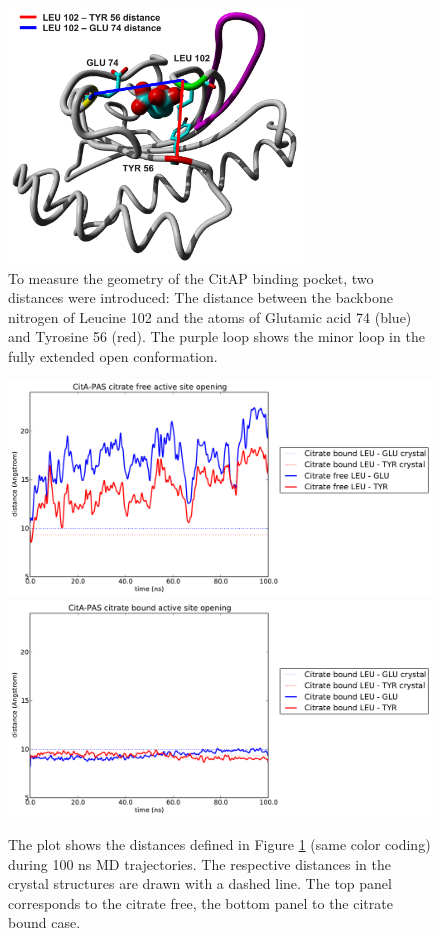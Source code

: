 \documentclass[english, a4paper, 12pt, titlepage, draft]{article}
\begin{document}
\begin{figure}
    \centering
    \includegraphics[width=0.7\textwidth]{figures/CitA_pocket2.pdf}
    \caption{To measure the geometry of the CitAP binding pocket, two distances were introduced: The distance between the backbone nitrogen of Leucine 102 and the  atoms of Glutamic acid 74 (blue) and Tyrosine 56 (red).
    The purple loop shows the minor loop in the fully extended open conformation.}
    \label{fig:CitA_pocket}
\end{figure}        

\begin{figure}
    \centering
    \includegraphics[width=1.0\textwidth]{figures/CitA_opening_citrate_free.pdf}
    \includegraphics[width=1.0\textwidth]{figures/CitA_opening_citrate_bound.pdf}
    \caption{The plot shows the distances defined in Figure \ref{fig:CitA_pocket} (same color coding) during 100 ns MD trajectories. The respective distances in the crystal structures are drawn with a dashed line. The top panel corresponds to the citrate free, the bottom panel to the citrate bound case.}
    \label{fig:CitA_opening_distances}
\end{figure}       
\end{document}
